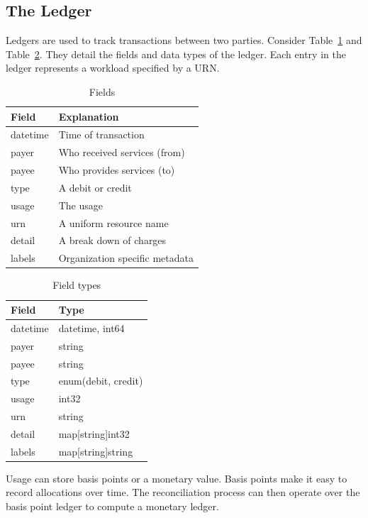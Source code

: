 \documentclass[10pt, a4paper, twocolumn]{article}
\begin{document}
  \subsection*{The Ledger}
    Ledgers are used to track transactions between two parties.
    Consider Table~\ref{table:2} and Table~\ref{table:3}.
    They detail the fields and data types of the ledger.
    Each entry in the ledger represents a workload specified by a URN.

    \begin{table}[H]
      \centering
      \begin{tabular}{ l|l }
        Field & Explanation \\
        \hline
        datetime & Time of transaction \\
        payer & Who received services (from) \\
        payee & Who provides services (to) \\
        type & A debit or credit \\
        usage & The usage \\
        urn & A uniform resource name \\
        detail & A break down of charges \\
        labels & Organization specific metadata \\
      \end{tabular}
      \caption{Fields}
      \label{table:2}
    \end{table}

    \begin{table}[H]
      \centering
      \begin{tabular}{ l|l }
        Field & Type \\
        \hline
        datetime & datetime, int64 \\
        payer & string \\
        payee & string \\
        type & enum(debit, credit) \\
        usage & int32 \\
        urn & string \\
        detail & map[string]int32 \\
        labels & map[string]string \\
      \end{tabular}
      \caption{Field types}
      \label{table:3}
    \end{table}

    Usage can store basis points or a monetary value.
    Basis points make it easy to record allocations over time.
    The reconciliation process can then operate over the basis point ledger to compute a monetary ledger.
\end{document}
